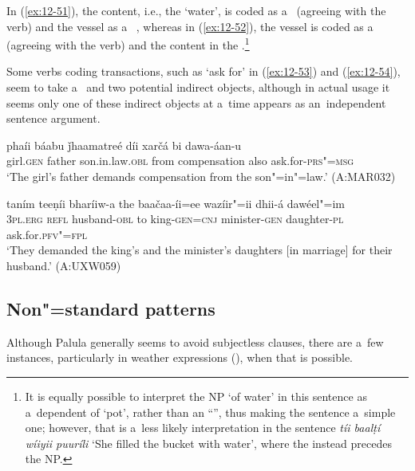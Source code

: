 In (\ref{ex:12-51}), the content, i.e., the `water', is coded as a~ (agreeing with the  verb) and the vessel as a~ , whereas in (\ref{ex:12-52}), the vessel is coded as a~ (agreeing with the  verb) and the content in the .\footnote{It is equally possible to interpret the  NP `of water' in this sentence as a~dependent of `pot', rather than an ``'', thus making the sentence a~simple  one; however, that is a~less likely interpretation in the sentence \textit{tíi baalṭí wíiyii puuríli} `She filled the bucket with water', where the  instead precedes the  NP.} 


Some verbs coding transactions, such as `ask for' in (\ref{ex:12-53}) and (\ref{ex:12-54}), seem to take a~ and two potential indirect objects, although in actual usage it seems only one of these indirect objects at a~time appears as an~independent sentence argument. 

\begin{exe}
\ex
\label{ex:12-53}
\gll phaíi báabu ǰhaamatreé díi xarčá bi dawa-áan-u \\
girl.\textsc{gen} father son.in.law.\textsc{obl} from compensation also ask.for-\textsc{prs"=msg} \\
\glt `The girl's father demands compensation from the son"=in"=law.' (A:MAR032)
\end{exe}
\begin{exe}
\ex
\label{ex:12-54}
\gll taním teeṇíi bharíiw-a the baačaa-íi=ee wazíir"=ii dhii-á dawéel"=im \\
3\textsc{pl.erg} \textsc{refl} husband-\textsc{obl} to king-\textsc{gen=cnj}  minister-\textsc{gen} daughter-\textsc{pl} ask.for.\textsc{pfv"=fpl}\\
\glt `They demanded the king's and the minister's daughters [in marriage] for their husband.' (A:UXW059)
\end{exe}

\subsection{Non"=standard  patterns}
\label{subsec:12-2-6}

 Although Palula generally seems to avoid subjectless clauses, there are a~few instances, particularly in weather expressions (), when that is possible.



